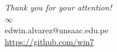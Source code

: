 \documentclass{beamer}
\begin{document}
\begin{frame}[allowframebreaks]
    
    \tiny
\end{frame}

\begin{frame}
    \begin{center}
        {\Huge\textit{Thank you for your attention!}}\\
        $\infty$ \\
        edwin.alvarez@unsaac.edu.pe\\
        \url{https://github.com/win7}
    \end{center}
\end{frame}

% 
\end{document}
